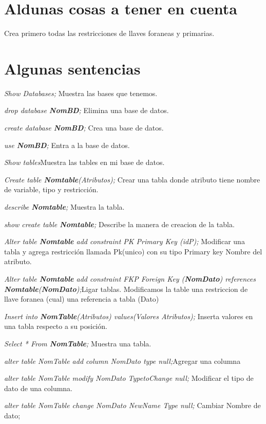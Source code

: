 \documentclass[12pt, fleqn]{report}                             %
\theoremstyle{break}                                            %
\begin{document}
    \section{Aldunas cosas a tener en cuenta}
    Crea primero todas las restricciones de llaves foraneas y primarias.
    
	\section{Algunas sentencias}

	\emph{Show Databases;} Muestra las bases que tenemos.


	\emph{drop database \textbf{NomBD};} Elimina una base de datos.

	\emph{create database \textbf{NomBD};} Crea una base de datos.

	\emph{use \textbf{NomBD};} Entra a la base de datos.

	\emph{Show tables}Muestra las tables en mi base de datos.
 
	\emph{Create table \textbf{Nomtable}(Atributos);} Crear una tabla donde atributo tiene nombre de variable, tipo y restricción.

	\emph{describe \textbf{Nomtable};} Muestra la tabla.

	\emph{show create table \textbf{Nomtable};} Describe la manera de creacion de la tabla.

	\emph{Alter table \textbf{Nomtable} add constraint PK Primary Key (idP);} Modificar una tabla y agrega restricción llamada Pk(unico) con su tipo Primary key Nombre del atributo.

	\emph{Alter table \textbf{Nomtable} add constraint FKP Foreign Key (\textbf{NomDato}) references \textbf{Nomtable}(\textbf{NomDato});}Ligar tablas. Modificamos la table una restriccion de llave foranea (cual) una referencia a tabla (Dato)


	\emph{Insert into \textbf{NomTable}(Atributos) values(Valores Atributos);} Inserta valores en una tabla respecto a su posición.

	\emph{Select * From \textbf{NomTable};} Muestra una tabla.

	\emph{alter table NomTable add column NomDato type null;}Agregar una columna

	\emph{alter table NomTable modify NomDato TypetoChange null;} Modificar el tipo de dato de una columna.

	\emph{alter table NomTable change NomDato NewName Type null;} Cambiar Nombre de dato;
\end{document}

